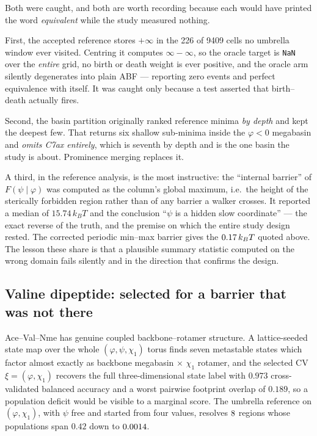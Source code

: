 \begin{remark}
\label{rem:ala_bugs}
Both were caught, and both are worth recording because each would have printed the word
\emph{equivalent} while the study measured nothing.

First, the accepted reference stores $+\infty$ in the 226 of 9409 cells no umbrella window
ever visited. Centring it computes $\infty - \infty$, so the oracle target is \texttt{NaN}
over the \emph{entire} grid, no birth or death weight is ever positive, and the oracle arm
silently degenerates into plain ABF --- reporting zero events and perfect equivalence with
itself. It was caught only because a test asserted that birth--death actually fires.

Second, the basin partition originally ranked reference minima \emph{by depth} and kept the
deepest few. That returns six shallow sub-minima inside the $\varphi<0$ megabasin and
\emph{omits C7ax entirely}, which is seventh by depth and is the one basin the study is
about. Prominence merging replaces it.

A third, in the reference analysis, is the most instructive: the ``internal barrier'' of
$F(\psi\mid\varphi)$ was computed as the column's global maximum, i.e.\ the height of the
sterically forbidden region rather than of any barrier a walker crosses. It reported a median
of $15.74\,k_BT$ and the conclusion ``$\psi$ is a hidden slow coordinate'' --- the exact
reverse of the truth, and the premise on which the entire study design rested. The corrected
periodic min--max barrier gives the $0.17\,k_BT$ quoted above. The lesson these
share is that a plausible summary statistic computed on the wrong domain fails silently and
in the direction that confirms the design.
\end{remark}

\subsection{Valine dipeptide: selected for a barrier that was not there}
\label{sec:val}
Ace--Val--Nme has genuine coupled backbone--rotamer structure. A lattice-seeded state map
over the whole $(\varphi,\psi,\chi_1)$ torus finds seven metastable states which factor
almost exactly as backbone megabasin $\times$ $\chi_1$ rotamer, and the selected CV
$\xi = (\varphi,\chi_1)$ recovers the full three-dimensional state label with $0.973$
cross-validated balanced accuracy and a worst pairwise footprint overlap of $0.189$, so a
population deficit would be visible to a marginal score. The umbrella reference on
$(\varphi,\chi_1)$, with $\psi$ free and started from four values, resolves $8$
regions whose populations span $0.42$ down to $0.0014$.

